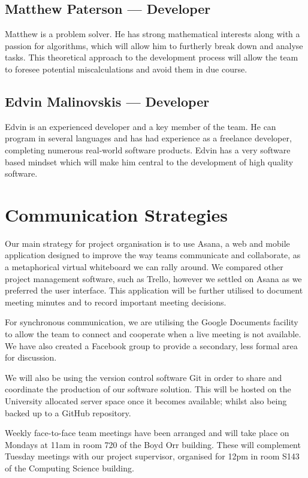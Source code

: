 \documentclass{article}
\begin{document}
\subsection{Matthew Paterson --- Developer}
Matthew is a problem solver. He has strong mathematical interests along with a
passion for algorithms, which will allow him to furtherly break down and
analyse tasks. This theoretical approach to the development process will allow
the team to foresee potential miscalculations and avoid them in due course. 

\subsection{Edvin Malinovskis --- Developer}
Edvin is an experienced developer and a key member of the team. He can program
in several languages and has had experience as a freelance developer,
completing numerous real-world software products. Edvin has a very software
based mindset which will make him central to the development of high quality
software. 

\pagebreak
\section{Communication Strategies}
Our main strategy for project organisation is to use Asana, a web and mobile
application designed to improve the way teams communicate and collaborate, as a
metaphorical virtual whiteboard we can rally around. We compared other project
management software, such as Trello, however we settled on Asana as we
preferred the user interface. This application will be further utilised to document meeting minutes and to record important meeting decisions.

For synchronous communication, we are utilising the Google Documents facility to allow the team to connect and cooperate when a live meeting is not
available. We have also created a Facebook group to provide a secondary, less formal area for discussion.

We will also be using the version control software Git in order to share and
coordinate the production of our software solution. This will be hosted on the
University allocated server space once it becomes available; whilst also being
backed up to a GitHub repository.

Weekly face-to-face team meetings have been arranged and will take place on Mondays at 11am in room 720 of the Boyd Orr building. These will complement Tuesday meetings with our project supervisor, organised for 12pm in room S143 of the Computing Science building.
\end{document}

